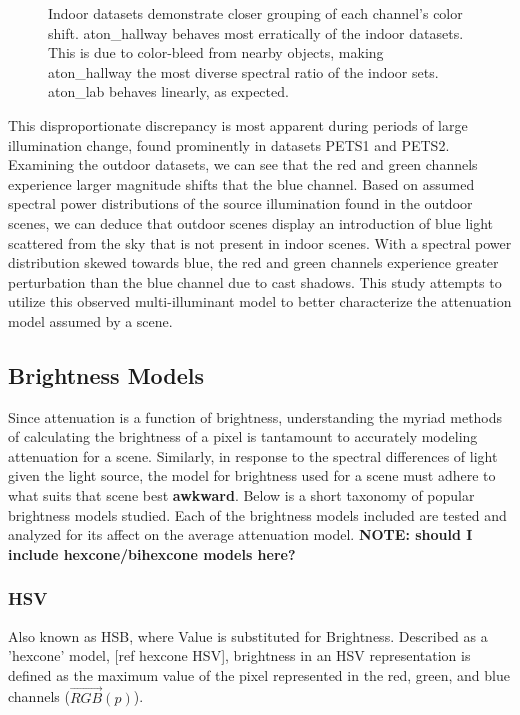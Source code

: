 \documentclass[12pt]{report}
\begin{document}
\begin{figure}
\caption{Indoor datasets demonstrate closer grouping of each channel's color shift. aton\_hallway behaves most erratically of the indoor datasets. This is due to color-bleed from nearby objects, making aton\_hallway the most diverse spectral ratio of the indoor sets. aton\_lab behaves linearly, as expected.}
\label{fig:rgshift_indoor}
\end{figure}

This disproportionate discrepancy is most apparent during periods of large illumination change, found prominently in datasets PETS1 and PETS2. Examining the outdoor datasets, we can see that the red and green channels experience larger magnitude shifts that the blue channel. Based on assumed spectral power distributions of the source illumination found in the outdoor scenes, we can deduce that outdoor scenes display an introduction of blue light scattered from the sky that is not present in indoor scenes. With a spectral power distribution skewed towards blue, the red and green channels experience greater perturbation than the blue channel due to cast shadows. This study attempts to utilize this observed multi-illuminant model to better characterize the attenuation model assumed by a scene. 

\subsection{Brightness Models}

Since attenuation is a function of brightness, understanding the myriad methods of calculating the brightness of a pixel is tantamount to accurately modeling attenuation for a scene. Similarly, in response to the spectral differences of light given the light source, the model for brightness used for a scene must adhere to what suits that scene best \textbf{awkward}. Below is a short taxonomy of popular brightness models studied. Each of the brightness models included are tested and analyzed for its affect on the average attenuation model. \textbf{NOTE: should I include hexcone/bihexcone models here?}

\subsubsection{HSV}

Also known as HSB, where Value is substituted for Brightness. Described as a 'hexcone' model, [ref hexcone HSV], brightness in an HSV representation is defined as the maximum value of the pixel represented in the red, green, and blue channels ($\vec{RGB}(p)$).
\end{document}
